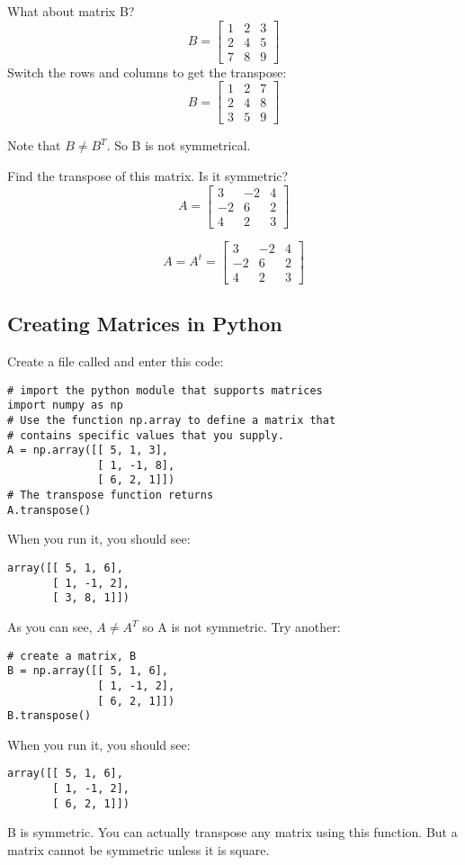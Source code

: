 What about matrix B? 
$$
B = \begin{bmatrix}
1 & 2 & 3 \\
2 & 4 & 5 \\
7 & 8 & 9
\end{bmatrix}
$$
Switch the rows and columns to get the transpose:
$$
B = \begin{bmatrix}
1 & 2 & 7 \\
2 & 4 & 8 \\
3 & 5 & 9
\end{bmatrix}
$$

Note that $B \neq B^T$. So B is not symmetrical.

\begin{Exercise}[title={Matrix Transposition}, label=matrix-transpose01]
Find the transpose of this matrix. Is it symmetric? 
$$A = \begin{bmatrix}
 		3 & -2 &4  \\
 		-2 & 6 &2 \\
 		4 & 2 & 3 
	  \end{bmatrix}$$
\end{Exercise}
\begin{Answer}[ref=matrix-transpose01]
$$A =  A^t = 
	  \begin{bmatrix}
 		3 & -2 & 4  \\
 		-2 & 6 & 2 \\
 		4 & 2 & 3 
	\end{bmatrix}$$
\end{Answer}

\subsection{Creating Matrices in Python}

Create a file called  and enter this code:
\begin{Verbatim}
# import the python module that supports matrices
import numpy as np
# Use the function np.array to define a matrix that 
# contains specific values that you supply.
A = np.array([[ 5, 1, 3], 
              [ 1, -1, 8], 
              [ 6, 2, 1]])
# The transpose function returns 
A.transpose()
\end{Verbatim}
When you run it, you should see:
\begin{Verbatim}
array([[ 5, 1, 6], 
       [ 1, -1, 2], 
       [ 3, 8, 1]])
\end{Verbatim}
As you can see, $A\neq A^T$ so A is not symmetric.
Try another: 
\begin{Verbatim}
# create a matrix, B
B = np.array([[ 5, 1, 6], 
              [ 1, -1, 2], 
              [ 6, 2, 1]])
B.transpose()
\end{Verbatim}
When you run it, you should see:
\begin{Verbatim}
array([[ 5, 1, 6], 
       [ 1, -1, 2], 
       [ 6, 2, 1]])
\end{Verbatim}
B is symmetric. You can actually transpose any matrix using this function. But a matrix cannot be symmetric unless it is square. 


